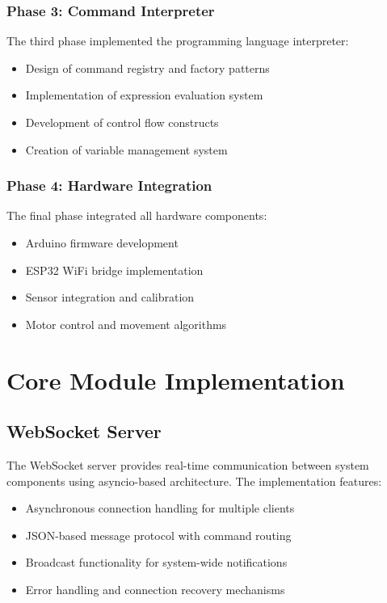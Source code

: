 \subsubsection{Phase 3: Command Interpreter}
The third phase implemented the programming language interpreter:
\begin{itemize}
    \item Design of command registry and factory patterns
    \item Implementation of expression evaluation system
    \item Development of control flow constructs
    \item Creation of variable management system
\end{itemize}

\subsubsection{Phase 4: Hardware Integration}
The final phase integrated all hardware components:
\begin{itemize}
    \item Arduino firmware development
    \item ESP32 WiFi bridge implementation
    \item Sensor integration and calibration
    \item Motor control and movement algorithms
\end{itemize}

\section{Core Module Implementation}

\subsection{WebSocket Server}

The WebSocket server provides real-time communication between system components using asyncio-based architecture. The implementation features:

\begin{itemize}
    \item Asynchronous connection handling for multiple clients
    \item JSON-based message protocol with command routing
    \item Broadcast functionality for system-wide notifications
    \item Error handling and connection recovery mechanisms
\end{itemize}


